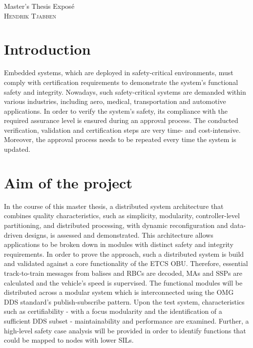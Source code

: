\documentclass[a4paper, 12pt]{scrartcl}
\begin{document}
\begin{center}
  \Huge{Master's Thesis Expos\'{e}}\\
  \large{\textsc{Hendrik Tjabben}}
\end{center}

\section*{Introduction}
Embedded systems, which are deployed in safety-critical environments, must comply with certification requirements to demonstrate the system's functional safety and integrity.
Nowadays, such safety-critical systems are demanded within various industries, including aero, medical, transportation and automotive applications.
In order to verify the system's safety, its compliance with the required assurance level is ensured during an approval process.
The conducted verification, validation and certification steps are very time- and cost-intensive.
Moreover, the approval process needs to be repeated every time the system is updated.

\section*{Aim of the project}
In the course of this master thesis, a distributed system architecture that combines quality characteristics, such as simplicity, modularity, control\-ler-level partitioning, and distributed processing, with dynamic reconfiguration and data-driven designs, is assessed and demonstrated.
This architecture allows applications to be broken down in modules with distinct safety and integrity requirements.
In order to prove the approach, such a distributed system is build and validated against a core functionality of the \ac{ETCS OBU}.
Therefore, essential track-to-train messages from balises and \acp{RBC} are decoded, \acp{MA} and \acp{SSP} are calculated and the vehicle's speed is supervised.
The functional modules will be distributed across a modular system which is interconnected using the \ac{OMG} \ac{DDS} standard's publish-subscribe pattern.
Upon the test system, characteristics such as certifiability - with a focus modularity and the identification of a sufficient \ac{DDS} subset - maintainability and performance are examined.
Further, a high-level safety case analysis will be provided in order to identify functions that could be mapped to nodes with lower \acp{SIL}.
\end{document}
